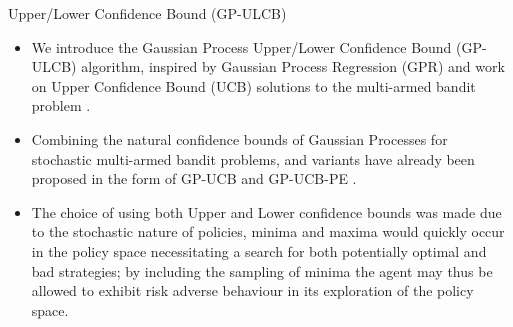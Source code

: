 \documentclass{beamer}
\begin{document}
\begin{frame}{Upper/Lower Confidence Bound (GP-ULCB)}

\begin{itemize}
\item We introduce the Gaussian Process Upper/Lower Confidence Bound  (GP-ULCB) algorithm, inspired by Gaussian Process Regression (GPR) and work on Upper Confidence Bound (UCB) solutions to the multi-armed bandit problem 
\cite{Auer2010}\cite{Auer2002}. 
\item Combining the natural confidence bounds of Gaussian Processes for stochastic multi-armed bandit problems, and variants have already been proposed in the form of GP-UCB \cite{Srinivas2009} and GP-UCB-PE \cite{Contal2013}. 
\item The choice of using both Upper and Lower confidence bounds was made due to the stochastic nature of policies, minima and maxima would quickly occur in the policy space necessitating a search for both potentially optimal and bad strategies; by including the sampling of minima the agent may thus be allowed to exhibit risk adverse behaviour in its exploration of the policy space. 

\end{itemize}



\end{frame}
\end{document}
